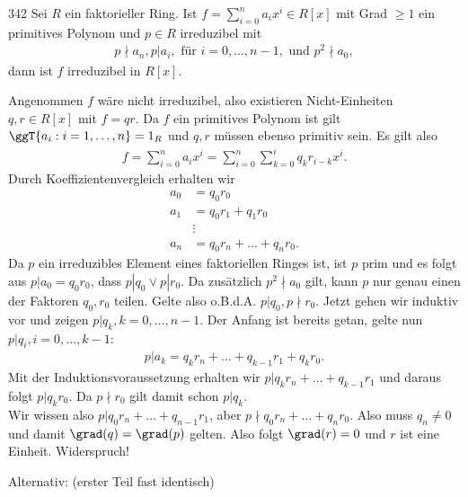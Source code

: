 \begin{algebraUE}{342}
Sei $R$ ein faktorieller Ring. Ist $f = \sum_{i=0}^na_ix^i \in R[x]$ mit Grad $\geq 1$
ein primitives Polynom und $p \in R$ irreduzibel mit
\begin{align*}
  p \nmid a_n, p | a_i, \text{ für } i = 0,\dots,n-1, \text{ und } p^2 \nmid a_0,
\end{align*}
dann ist $f$ irreduzibel in $R[x]$.
\end{algebraUE}

\begin{solution}
Angenommen $f$ wäre nicht irreduzibel, also existieren Nicht-Einheiten $q,r \in R[x]$ mit $f = qr$.
Da $f$ ein primitives Polynom ist gilt $\ggT\{a_i: i = 1,\dots,n\} = 1_R$ und $q,r$
müssen ebenso primitiv sein. Es gilt also
\begin{align*}
  f = \sum_{i=0}^na_ix^i = \sum_{i = 0}^n \sum_{k= 0}^i q_kr_{i-k}x^i.
\end{align*}
Durch Koeffizientenvergleich erhalten wir
\begin{align*}
  a_0 &= q_0r_0 \\
  a_1 &= q_0r_1 + q_1r_0 \\
  &\vdots \\
  a_n &= q_0r_n + \dots + q_nr_0.
\end{align*}
Da $p$ ein irreduzibles Element eines faktoriellen Ringes ist, ist $p$ prim und es folgt
aus $p| a_0 = q_0r_0$, dass $p|q_0 \lor p|r_0$. Da zusätzlich $p^2 \nmid a_0$ gilt,
kann $p$ nur genau einen der Faktoren $q_0,r_0$ teilen. Gelte also o.B.d.A. $p | q_0, p \nmid r_0$.
Jetzt gehen wir induktiv vor und zeigen $p | q_k, k = 0,\dots,n-1$. Der Anfang ist bereits getan,
gelte nun $p | q_{i}, i = 0,\dots,k-1$:
\begin{align*}
  p | a_k = q_kr_n + \dots + q_{k-1}r_1 + q_kr_0.
\end{align*}
Mit der Induktionsvoraussetzung erhalten wir $p | q_kr_n + \dots + q_{k-1}r_1$
und daraus folgt $p | q_kr_0$. Da $p \nmid r_0$ gilt damit schon $p | q_k$. \\
Wir wissen also $p | q_0r_n + \dots + q_{n-1}r_1$, aber $p \nmid q_0r_n + \dots + q_nr_0$.
Also muss $q_n \neq 0$ und damit $\grad(q) = \grad(p)$ gelten. Also folgt $\grad(r) = 0$
und $r$ ist eine Einheit. Widerspruch!

Alternativ: (erster Teil fast identisch)


\end{solution}
